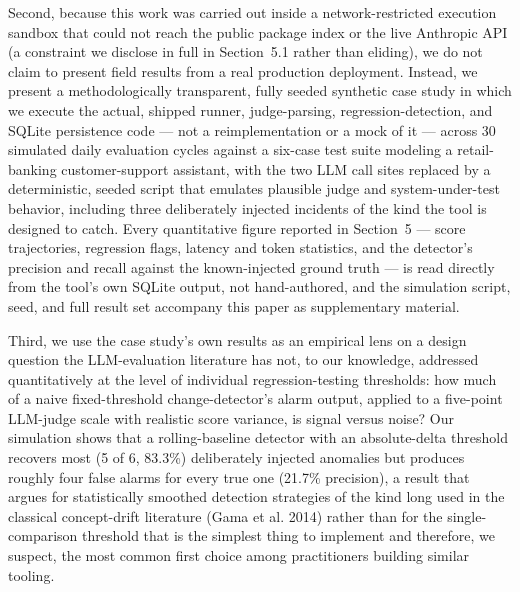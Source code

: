 \documentclass[11pt,a4paper]{article}
\begin{document}
Second, because this work was carried out inside a network-restricted
execution sandbox that could not reach the public package index or the
live Anthropic API (a constraint we disclose in full in Section~5.1
rather than eliding), we do not claim to present field results from a
real production deployment. Instead, we present a methodologically
transparent, fully seeded synthetic case study in which we execute the
actual, shipped runner, judge-parsing, regression-detection, and SQLite
persistence code --- not a reimplementation or a mock of it --- across
30 simulated daily evaluation cycles against a six-case test suite
modeling a retail-banking customer-support assistant, with the two LLM
call sites replaced by a deterministic, seeded script that emulates
plausible judge and system-under-test behavior, including three
deliberately injected incidents of the kind the tool is designed to
catch. Every quantitative figure reported in Section~5 --- score
trajectories, regression flags, latency and token statistics, and the
detector's precision and recall against the
known-injected ground truth --- is read directly from the
tool's own SQLite output, not hand-authored, and the
simulation script, seed, and full result set accompany this paper as
supplementary material.

Third, we use the case study's own results as an
empirical lens on a design question the LLM-evaluation literature has
not, to our knowledge, addressed quantitatively at the level of
individual regression-testing thresholds: how much of a naive
fixed-threshold change-detector's alarm output, applied
to a five-point LLM-judge scale with realistic score variance, is signal
versus noise? Our simulation shows that a rolling-baseline detector with
an absolute-delta threshold recovers most (5 of 6, 83.3\%) deliberately
injected anomalies but produces roughly four false alarms for every true
one (21.7\% precision), a result that argues for statistically smoothed
detection strategies of the kind long used in the classical
concept-drift literature (Gama et al. 2014) rather than for the
single-comparison threshold that is the simplest thing to implement and
therefore, we suspect, the most common first choice among practitioners
building similar tooling.
\end{document}

